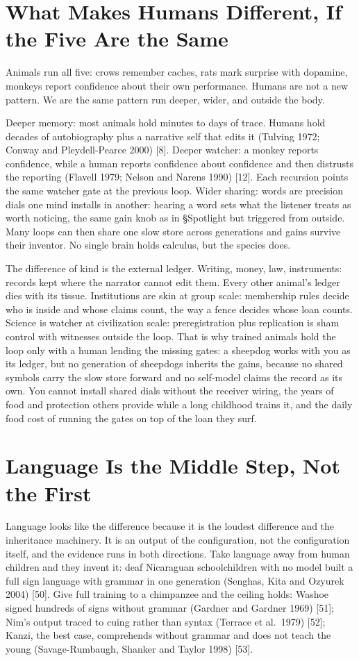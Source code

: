 \documentclass[11pt,a4paper]{article}
\begin{document}
\section{What Makes Humans Different, If the Five Are the Same}

Animals run all five: crows remember caches, rats mark surprise with dopamine, monkeys report confidence about their own performance. Humans are not a new pattern. We are the same pattern run deeper, wider, and outside the body.

Deeper memory: most animals hold minutes to days of trace. Humans hold decades of autobiography plus a narrative self that edits it (Tulving 1972; Conway and Pleydell-Pearce 2000) [8]. Deeper watcher: a monkey reports confidence, while a human reports confidence about confidence and then distrusts the reporting (Flavell 1979; Nelson and Narens 1990) [12]. Each recursion points the same watcher gate at the previous loop. Wider sharing: words are precision dials one mind installs in another: hearing a word sets what the listener treats as worth noticing, the same gain knob as in §Spotlight but triggered from outside. Many loops can then share one slow store across generations and gains survive their inventor. No single brain holds calculus, but the species does.

The difference of kind is the external ledger. Writing, money, law, instruments: records kept where the narrator cannot edit them. Every other animal's ledger dies with its tissue. Institutions are skin at group scale: membership rules decide who is inside and whose claims count, the way a fence decides whose loan counts. Science is watcher at civilization scale: preregistration plus replication is sham control with witnesses outside the loop. That is why trained animals hold the loop only with a human lending the missing gates: a sheepdog works with you as its ledger, but no generation of sheepdogs inherits the gains, because no shared symbols carry the slow store forward and no self-model claims the record as its own. You cannot install shared dials without the receiver wiring, the years of food and protection others provide while a long childhood trains it, and the daily food cost of running the gates on top of the loan they surf.

\section{Language Is the Middle Step, Not the First}

Language looks like the difference because it is the loudest difference and the inheritance machinery. It is an output of the configuration, not the configuration itself, and the evidence runs in both directions. Take language away from human children and they invent it: deaf Nicaraguan schoolchildren with no model built a full sign language with grammar in one generation (Senghas, Kita and Ozyurek 2004) [50]. Give full training to a chimpanzee and the ceiling holds: Washoe signed hundreds of signs without grammar (Gardner and Gardner 1969) [51]; Nim's output traced to cuing rather than syntax (Terrace et al.\ 1979) [52]; Kanzi, the best case, comprehends without grammar and does not teach the young (Savage-Rumbaugh, Shanker and Taylor 1998) [53].
\end{document}
